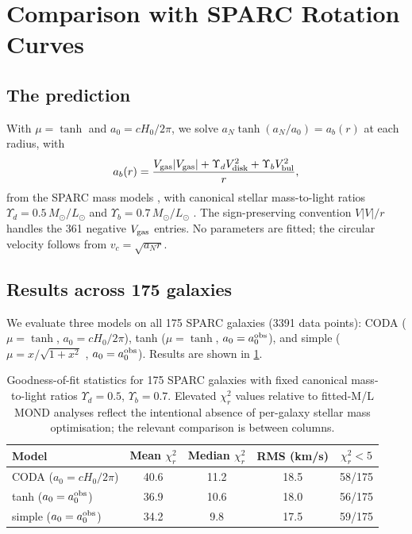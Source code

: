 \documentclass[a4paper,11pt]{article}
\newcommand{\az}{a_0}                                %
\newcommand{\aN}{a_N}                                %
\newcommand{\ab}{a_b}                                %
\begin{document}
\section{Comparison with SPARC Rotation Curves}
\label{sec:SPARC}

\subsection{The prediction}

With $\mu=\tanh$ and $\az=cH_0/2\pi$, we solve $\aN\tanh(\aN/\az)=\ab(r)$
at each radius, with
\begin{equation}
  \ab(r) = \frac{V_{\rm gas}|V_{\rm gas}|+\Upsilon_d V_{\rm disk}^2
              +\Upsilon_b V_{\rm bul}^2}{r},
  \label{eq:ab}
\end{equation}
from the SPARC mass models \cite{Lelli:2016}, with canonical stellar
mass-to-light ratios $\Upsilon_d=0.5\,M_\odot/L_\odot$ and
$\Upsilon_b=0.7\,M_\odot/L_\odot$ \cite{Schombert:2020}.  The
sign-preserving convention $V|V|/r$ handles the 361 negative
$V_{\rm gas}$ entries.  No parameters are fitted; the circular velocity
follows from $v_c=\sqrt{\aN r}$.

\subsection{Results across 175 galaxies}

We evaluate three models on all 175 SPARC galaxies (3391 data points):
CODA ($\mu=\tanh$, $\az=cH_0/2\pi$), tanh ($\mu=\tanh$, $\az=\az^{\rm obs}$),
and simple ($\mu=x/\sqrt{1+x^2}$ \cite{Zhao:2006}, $\az=\az^{\rm obs}$).
Results are shown in \cref{tab:sparc}.

\begin{table}[h]
\centering
\renewcommand{\arraystretch}{1.3}
\begin{tabular}{lcccc}
  \toprule
  Model & Mean $\chi^2_r$ & Median $\chi^2_r$ & RMS (km/s) & $\chi^2_r<5$ \\
  \midrule
  CODA ($\az=cH_0/2\pi$) & 40.6 & 11.2 & 18.5 & 58/175 \\
  tanh ($\az=\az^{\rm obs}$) & 36.9 & 10.6 & 18.0 & 56/175 \\
  simple ($\az=\az^{\rm obs}$) & 34.2 & 9.8 & 17.5 & 59/175 \\
  \bottomrule
\end{tabular}
\caption{Goodness-of-fit statistics for 175 SPARC galaxies with fixed
  canonical mass-to-light ratios $\Upsilon_d=0.5$, $\Upsilon_b=0.7$.
  Elevated $\chi^2_r$ values relative to fitted-M/L MOND analyses
  \cite{Famaey:2012} reflect the intentional absence of per-galaxy
  stellar mass optimisation; the relevant comparison is between columns.}
\label{tab:sparc}
\end{table}
\end{document}
